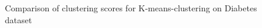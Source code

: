 \begin{figure}[H]
	\centering
	
	\caption{Comparison of clustering scores for K-means-clustering on Diabetes dataset}%
\end{figure}

